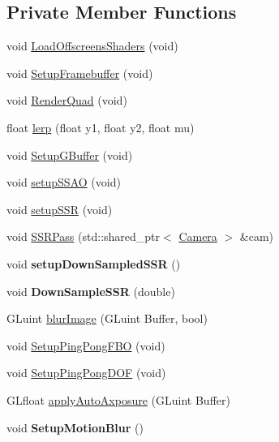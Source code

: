 \subsection*{Private Member Functions}
\begin{DoxyCompactItemize}
\item 
void \hyperlink{class_post_process_a6dae442b486eae1998836bb77055e684}{Load\+Offscreens\+Shaders} (void)
\item 
void \hyperlink{class_post_process_a08977c2caa835dd252648edaedbd320f}{Setup\+Framebuffer} (void)
\item 
void \hyperlink{class_post_process_ad0e21d0808e0a70d2c996a7ab9e3b0ce}{Render\+Quad} (void)
\item 
float \hyperlink{class_post_process_aef30f3a7c5c63af503e5bc8a943469c0}{lerp} (float y1, float y2, float mu)
\item 
void \hyperlink{class_post_process_aa34071cd45a83f46b63622d2710d7990}{Setup\+G\+Buffer} (void)
\item 
void \hyperlink{class_post_process_aa78e9436eb2ee584aa68f4a780dfb0d7}{setup\+S\+S\+AO} (void)
\item 
void \hyperlink{class_post_process_a4f569f4f7f341895fc01429d11053d17}{setup\+S\+SR} (void)
\item 
void \hyperlink{class_post_process_aa7f1380b9b6a59b264bd305935547a81}{S\+S\+R\+Pass} (std\+::shared\+\_\+ptr$<$ \hyperlink{class_camera}{Camera} $>$ \&cam)
\item 
void {\bfseries setup\+Down\+Sampled\+S\+SR} ()\hypertarget{class_post_process_a970e3b0c805141809ba796bd8a2ebbb9}{}\label{class_post_process_a970e3b0c805141809ba796bd8a2ebbb9}

\item 
void {\bfseries Down\+Sample\+S\+SR} (double)\hypertarget{class_post_process_a37fd8b3a1f4261c986a1d427e26daa25}{}\label{class_post_process_a37fd8b3a1f4261c986a1d427e26daa25}

\item 
G\+Luint \hyperlink{class_post_process_af633b9be568ce821e0c7affca38ae2f8}{blur\+Image} (G\+Luint Buffer, bool)
\item 
void \hyperlink{class_post_process_a0487c53687150b2c46f210f2aebf3eac}{Setup\+Ping\+Pong\+F\+BO} (void)
\item 
void \hyperlink{class_post_process_a0cec00da385424a8f0c67a44c61d1a0e}{Setup\+Ping\+Pong\+D\+OF} (void)
\item 
G\+Lfloat \hyperlink{class_post_process_ab337b3a4d3cce0fea1bc6ae3d25185bf}{apply\+Auto\+Axposure} (G\+Luint Buffer)
\item 
void {\bfseries Setup\+Motion\+Blur} ()\hypertarget{class_post_process_a64a4e67743d3967a678c0746234c3632}{}\label{class_post_process_a64a4e67743d3967a678c0746234c3632}


\end{DoxyCompactItemize}
